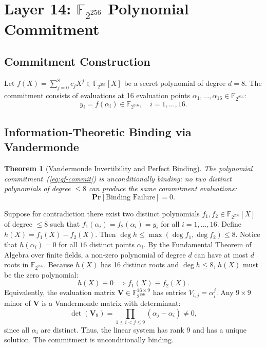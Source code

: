 \documentclass{ieeeaccess}
\renewcommand{\Pr}{\mathbf{Pr}}
\newcommand{\F}{\mathbb{F}}
\newcommand{\bfV}{\mathbf{V}}
\newtheorem{theorem}{Theorem}
\newenvironment{proof}{\begin{IEEEproof}\IEEEQEDoff}{\end{IEEEproof}}
\begin{document}
\section{Layer 14: $\F_{2^{256}}$ Polynomial Commitment}
\label{sec:L14}

\subsection{Commitment Construction}
Let $f(X) = \sum_{j=0}^8 c_j X^j \in \F_{2^{256}}[X]$ be a secret polynomial of degree $d = 8$.
The commitment consists of evaluations at 16 evaluation points $\alpha_1, \dots, \alpha_{16} \in \F_{2^{256}}$:
\begin{equation}
  y_i = f(\alpha_i) \in \F_{2^{256}}, \quad i = 1, \dots, 16.
  \label{eq:gf-commit}
\end{equation}

\subsection{Information-Theoretic Binding via Vandermonde}
\begin{theorem}[Vandermonde Invertibility and Perfect Binding]
\label{thm:L14-vandermonde}
The polynomial commitment~(\ref{eq:gf-commit}) is unconditionally binding: no two distinct polynomials of degree $\leq 8$ can produce the same commitment evaluations:
\begin{equation}
  \Pr[\text{Binding Failure}] = 0.
\end{equation}
\end{theorem}
\begin{proof}
Suppose for contradiction there exist two distinct polynomials $f_1, f_2 \in \F_{2^{256}}[X]$ of degree $\leq 8$ such that $f_1(\alpha_i) = f_2(\alpha_i) = y_i$ for all $i = 1, \dots, 16$.
Define $h(X) = f_1(X) - f_2(X)$.
Then $\deg h \leq \max(\deg f_1, \deg f_2) \leq 8$.
Notice that $h(\alpha_i) = 0$ for all $16$ distinct points $\alpha_i$.
By the Fundamental Theorem of Algebra over finite fields, a non-zero polynomial of degree $d$ can have at most $d$ roots in $\F_{2^{256}}$.
Because $h(X)$ has 16 distinct roots and $\deg h \leq 8$, $h(X)$ must be the zero polynomial:
\begin{equation}
  h(X) \equiv 0 \implies f_1(X) \equiv f_2(X).
\end{equation}
Equivalently, the evaluation matrix $\bfV \in \F_{2^{256}}^{16 \times 9}$ has entries $V_{i,j} = \alpha_i^j$.
Any $9 \times 9$ minor of $\bfV$ is a Vandermonde matrix with determinant:
\begin{equation}
  \det(\bfV_9) = \prod_{1 \leq i < j \leq 9} (\alpha_j - \alpha_i) \neq 0,
\end{equation}
since all $\alpha_i$ are distinct. Thus, the linear system has rank 9 and has a unique solution.
The commitment is unconditionally binding.
\end{proof}
\end{document}
